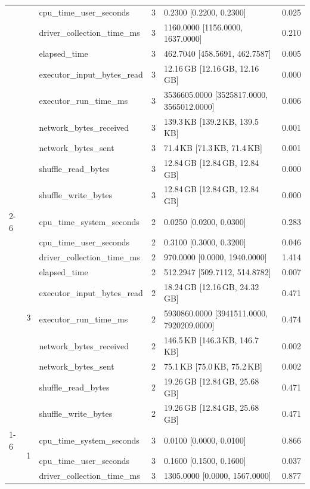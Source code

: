\begin{tabular}{lllrll}
 &  & cpu_time_user_seconds & 3 & 0.2300 [0.2200, 0.2300] & 0.025 \\
 &  & driver_collection_time_ms & 3 & 1160.0000 [1156.0000, 1637.0000] & 0.210 \\
 &  & elapsed_time & 3 & 462.7040 [458.5691, 462.7587] & 0.005 \\
 &  & executor_input_bytes_read & 3 & 12.16\,GB [12.16\,GB, 12.16\,GB] & 0.000 \\
 &  & executor_run_time_ms & 3 & 3536605.0000 [3525817.0000, 3565012.0000] & 0.006 \\
 &  & network_bytes_received & 3 & 139.3\,KB [139.2\,KB, 139.5\,KB] & 0.001 \\
 &  & network_bytes_sent & 3 & 71.4\,KB [71.3\,KB, 71.4\,KB] & 0.001 \\
 &  & shuffle_read_bytes & 3 & 12.84\,GB [12.84\,GB, 12.84\,GB] & 0.000 \\
 &  & shuffle_write_bytes & 3 & 12.84\,GB [12.84\,GB, 12.84\,GB] & 0.000 \\
\cline{2-6}
 & \multirow[t]{10}{*}{3} & cpu_time_system_seconds & 2 & 0.0250 [0.0200, 0.0300] & 0.283 \\
 &  & cpu_time_user_seconds & 2 & 0.3100 [0.3000, 0.3200] & 0.046 \\
 &  & driver_collection_time_ms & 2 & 970.0000 [0.0000, 1940.0000] & 1.414 \\
 &  & elapsed_time & 2 & 512.2947 [509.7112, 514.8782] & 0.007 \\
 &  & executor_input_bytes_read & 2 & 18.24\,GB [12.16\,GB, 24.32\,GB] & 0.471 \\
 &  & executor_run_time_ms & 2 & 5930860.0000 [3941511.0000, 7920209.0000] & 0.474 \\
 &  & network_bytes_received & 2 & 146.5\,KB [146.3\,KB, 146.7\,KB] & 0.002 \\
 &  & network_bytes_sent & 2 & 75.1\,KB [75.0\,KB, 75.2\,KB] & 0.002 \\
 &  & shuffle_read_bytes & 2 & 19.26\,GB [12.84\,GB, 25.68\,GB] & 0.471 \\
 &  & shuffle_write_bytes & 2 & 19.26\,GB [12.84\,GB, 25.68\,GB] & 0.471 \\
\cline{1-6} \cline{2-6}
\multirow[t]{30}{*}{national-scale-spatial-join-databricks-broadcast-2-nodes-medium} & \multirow[t]{10}{*}{1} & cpu_time_system_seconds & 3 & 0.0100 [0.0000, 0.0100] & 0.866 \\
 &  & cpu_time_user_seconds & 3 & 0.1600 [0.1500, 0.1600] & 0.037 \\
 &  & driver_collection_time_ms & 3 & 1305.0000 [0.0000, 1567.0000] & 0.877 \\

\end{tabular}

